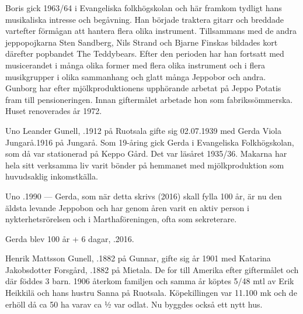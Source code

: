 Boris gick 1963/64 i Evangeliska folkhögskolan och här framkom tydligt hans musikaliska intresse och begåvning. Han började traktera gitarr och breddade vartefter förmågan att hantera flera olika instrument. Tillsammans med de andra jeppopojkarna Sten Sandberg, Nils Strand och Bjarne Finskas bildades kort därefter popbandet The Teddybears. Efter den perioden har han fortsatt med musicerandet i många	olika former med flera olika instrument och i flera musikgrupper i olika sammanhang och glatt många Jeppobor och andra. Gunborg har efter mjölkproduktionens upphörande arbetat på Jeppo Potatis fram till pensioneringen. Innan giftermålet arbetade hon som fabrikssömmerska. Huset renoverades år 1972.
\begin{jhchildren}
  \item {}
  \item {}
\end{jhchildren}


Uno Leander Gunell, .1912 på Ruotsala gifte sig 02.07.1939 med Gerda Viola Jungarå.1916 på Jungarå. Som 19-åring gick Gerda i Evangeliska Folkhögskolan, som då var stationerad på Keppo Gård. Det var läsåret 1935/36. Makarna har hela sitt verksamma liv varit bönder på hemmanet med mjölkproduktion som huvudsaklig inkomstkälla.
\begin{jhchildren}
  \item {}
  \item {}
\end{jhchildren}

Uno .1990 ---  Gerda, som när detta skrivs (2016) skall fylla 100 år, är nu den äldsta levande Jeppobon och har genom åren varit en aktiv person i nykterhetsrörelsen och i Marthaföreningen, ofta som sekreterare.

Gerda blev 100 år + 6 dagar, .2016.





Henrik Mattsson Gunell, .1882 på Gunnar, gifte sig år 1901 med Katarina Jakobsdotter Forsgård, .1882 på Mietala. De for till Amerika efter giftermålet och där föddes 3 barn. 1906 återkom familjen och samma år köptes 5/48 mtl av Erik Heikkilä och hans hustru Sanna på Ruotsala. Köpekillingen var 11.100 mk och de erhöll då ca 50 ha varav ca ½ var odlat. Nu byggdes också ett nytt hus.

